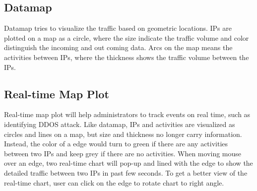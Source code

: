 \subsection{Datamap}
Datamap tries to visualize the traffic based on geometric locations. IPs are plotted on a map as a circle, where the size indicate the traffic volume and color distinguish the incoming and out coming data. Arcs on the map means the activities between IPs, where the thickness shows the traffic volume between the IPs.

\subsection{Real-time Map Plot}
Real-time map plot will help administrators to track events on real time, such as identifying DDOS attack. Like datamap, IPs and activities are visualized as circles and lines on a map, but size and thickness no longer carry information. Instead, the color of a edge would turn to green if there are any activities between two IPs and keep grey if there are no activities. When moving mouse over an edge, two real-time chart will pop-up and lined with the edge to show the detailed traffic between two IPs in past few seconds. To get a better view of the real-time chart, user can click on the edge to rotate chart to right angle.\\



